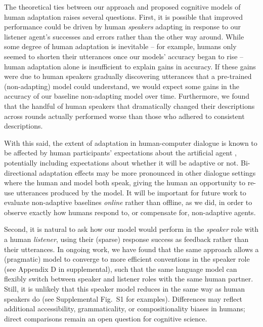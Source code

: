 \documentclass[11pt,a4paper]{article}
\begin{document}
The theoretical ties between our approach and proposed cognitive models of human adaptation raises several questions. 
First, it is possible that improved performance could be driven by human \emph{speakers} adapting in response to our listener agent's successes and errors rather than the other way around. 
While some degree of human adaptation is inevitable -- for example, humans only seemed to shorten their utterances once our models' accuracy began to rise -- human adaptation alone is insufficient to explain gains in accuracy.
If these gains were due to human speakers gradually discovering utterances that a pre-trained (non-adapting) model could understand, we would expect some gains in the accuracy of our baseline non-adapting model over time. 
Furthermore, we found that the handful of human speakers that dramatically changed their descriptions across rounds actually performed worse than those who adhered to consistent descriptions.

With this said, the extent of adaptation in human-computer dialogue is known to be affected by human participants' expectations about the artificial agent \cite{branigan2011role,koulouri2016and}, potentially including expectations about whether it will be adaptive or not.
Bi-directional adaptation effects may be more pronounced in other dialogue settings where the human and model both speak, giving the human an opportunity to re-use utterances produced by the model.
It will be important for future work to evaluate non-adaptive baselines \emph{online} rather than offline, as we did, in order to observe exactly how humans respond to, or compensate for, non-adaptive agents.

Second, it is natural to ask how our model would perform in the \emph{speaker} role with a human \emph{listener}, using their (sparse) response success as feedback rather than their utterances.
In ongoing work, we have found that the same approach allows a (pragmatic) model to converge to more efficient conventions in the speaker role (see Appendix D in supplemental), such that the same language model can flexibly switch between speaker and listener roles with the same human partner. 
Still, it is unlikely that this speaker model reduces in the same way as human speakers do (see Supplemental Fig.~S1 for examples). 
Differences may reflect additional accessibility, grammaticality, or compositionality biases in humans; direct comparisons remain an open question for cognitive science. 
\end{document}
